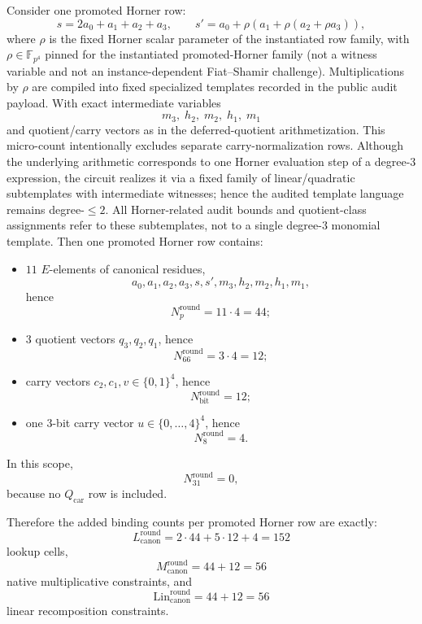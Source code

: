 ﻿\documentclass[11pt]{article}
\newcommand{\Ep}{\mathbb{F}_{p^4}}
\begin{document}
Consider one promoted Horner row:
\[
s = 2a_0+a_1+a_2+a_3,
\qquad
s' = a_0 + \rho(a_1+\rho(a_2+\rho a_3)),
\]
where \(\rho\) is the fixed Horner scalar parameter of the instantiated row
family, with \(\rho\in\Ep\) pinned for the instantiated promoted-Horner family
(not a witness variable and not an instance-dependent Fiat--Shamir challenge).
Multiplications by \(\rho\) are compiled into fixed specialized templates
recorded in the public audit payload.
With exact intermediate variables
\[
m_3,\; h_2,\; m_2,\; h_1,\; m_1
\]
and quotient/carry vectors as in the deferred-quotient arithmetization.
This micro-count intentionally excludes separate carry-normalization rows.
Although the underlying arithmetic corresponds to one Horner evaluation step of
a degree-\(3\) expression, the circuit realizes it via a fixed family of
linear/quadratic subtemplates with intermediate witnesses; hence the audited
template language remains degree-\(\le 2\).
All Horner-related audit bounds and quotient-class assignments refer to these
subtemplates, not to a single degree-\(3\) monomial template.
Then one promoted Horner row contains:
\begin{itemize}[leftmargin=2em]
    \item \(11\) \(E\)-elements of canonical residues,
    \[
    a_0,a_1,a_2,a_3,s,s',m_3,h_2,m_2,h_1,m_1,
    \]
    hence
    \[
    N_p^{\mathrm{round}} = 11\cdot 4 = 44;
    \]
    \item \(3\) quotient vectors \(q_3,q_2,q_1\), hence
    \[
    N_{66}^{\mathrm{round}} = 3\cdot 4 = 12;
    \]
    \item carry vectors \(c_2,c_1,v\in\{0,1\}^4\), hence
    \[
    N_{\mathrm{bit}}^{\mathrm{round}} = 12;
    \]
    \item one 3-bit carry vector \(u\in\{0,\dots,4\}^4\), hence
    \[
    N_8^{\mathrm{round}} = 4.
    \]
\end{itemize}
In this scope,
\[
N_{31}^{\mathrm{round}}=0,
\]
because no \(Q_{\mathrm{car}}\) row is included.

Therefore the added binding counts per promoted Horner row are exactly:
\begin{equation}
L_{\mathrm{canon}}^{\mathrm{round}}
=
2\cdot 44 + 5\cdot 12 + 4
=
152
\label{eq:round-lookup-cost}
\end{equation}
lookup cells,
\begin{equation}
M_{\mathrm{canon}}^{\mathrm{round}}
=
44 + 12
=
56
\label{eq:round-mul-cost}
\end{equation}
native multiplicative constraints, and
\begin{equation}
\mathrm{Lin}_{\mathrm{canon}}^{\mathrm{round}}
=
44 + 12
=
56
\label{eq:round-lin-cost}
\end{equation}
linear recomposition constraints.
\end{document}
